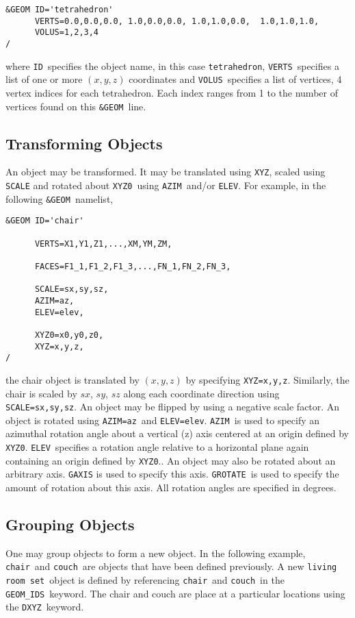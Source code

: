 \documentclass[12pt]{article}
\begin{document}
\begin{verbatim}
&GEOM ID='tetrahedron'
      VERTS=0.0,0.0,0.0, 1.0,0.0,0.0, 1.0,1.0,0.0,  1.0,1.0,1.0,
      VOLUS=1,2,3,4
/
\end{verbatim}

\noindent where {\tt ID}\ specifies the object name, in this case {\tt tetrahedron},
{\tt VERTS}\ specifies a list of one or more $(x,y,z)$ coordinates and {\tt VOLUS}\ specifies a list of vertices, 4 vertex indices for each
tetrahedron. Each index ranges from 1 to the number of vertices found on this {\tt \&GEOM}\ line.


\subsection{Transforming Objects}
An object may be transformed.
It  may be translated using {\tt XYZ}, scaled using {\tt SCALE} and rotated about {\tt XYZ0}\ using {\tt AZIM}\ and/or {\tt ELEV}.
For example, in the following {\tt \&GEOM}\ namelist,

\begin{verbatim}
&GEOM ID='chair'

      VERTS=X1,Y1,Z1,...,XM,YM,ZM,

      FACES=F1_1,F1_2,F1_3,...,FN_1,FN_2,FN_3,

      SCALE=sx,sy,sz,
      AZIM=az,
      ELEV=elev,

      XYZ0=x0,y0,z0,
      XYZ=x,y,z,
/
\end{verbatim}

\noindent the chair object is translated by $(x,y,z)$ by specifying {\tt XYZ=x,y,z}.
Similarly, the chair is scaled by $sx$, $sy$, $sz$ along each coordinate direction using {\tt SCALE=sx,sy,sz}.
An object may be flipped by using a negative scale factor.
An object is rotated using {\tt AZIM=az}\ and {\tt ELEV=elev}.
{\tt AZIM}\ is used to specify an azimuthal rotation angle about a vertical (z) axis centered at an origin defined by {\tt XYZ0}.
{\tt ELEV}\ specifies a rotation angle relative to a horizontal plane again containing an origin defined by {\tt XYZ0}..
An object may also be rotated about an arbitrary axis.
{\tt GAXIS} is used to specify this axis.
{\tt GROTATE}\ is used to specify the amount of rotation about this axis.
All rotation angles are specified in degrees.

\subsection{Grouping Objects}
One may group objects to form a new object.  In the following example,
{\tt chair}\ and {\tt couch}\ are objects that have been defined previously.  A new {\tt living room set}\ object
is defined by referencing {\tt chair}\ and {\tt couch}\ in the {\tt GEOM\_IDS}\ keyword.  The chair and couch
are place at a particular locations using the {\tt DXYZ}\ keyword.
\end{document}
